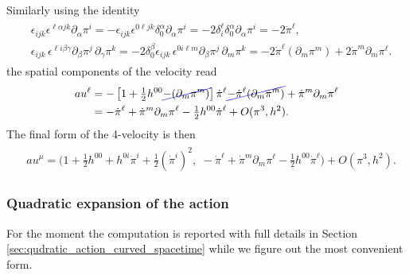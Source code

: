 Similarly using the identity
{\small\begin{align}\begin{aligned}
    &\epsilon_{ijk}\epsilon^{\ell\alpha jk}\partial_\alpha\pi^i= - \epsilon_{ijk}\epsilon^{0\ell jk}\delta^\alpha_0\partial_\alpha\pi^i = -2 \delta_i^\ell\delta^\alpha_0\partial_\alpha\pi^i = -2 \dot{\pi}^\ell,\\[2pt]
    & \epsilon_{ijk}\, \epsilon^{\ell i \beta\gamma}\partial_\beta\pi^j\,\partial_\gamma\pi^k= -2\delta^\beta_0 \epsilon_{ijk}\, \epsilon^{0 i \ell m} \partial_\beta\pi^j\,\partial_m\pi^k = -2 \dot{\pi}^\ell (\partial_m\pi^m) + 2 \dot{\pi}^m \partial_m\pi^\ell.
\end{aligned}
\end{align}}
the spatial components of the velocity read
{\small\begin{align}
    au^\ell &= -\left[1 + \tfrac12 h^{00}\bluecancel{-(\partial_m\pi^m)}\right]\dot{\pi}^\ell  \bluecancel{- \dot{\pi}^\ell (\partial_m\pi^m)} + \dot{\pi}^m \partial_m\pi^\ell\\
    &= - \dot{\pi}^\ell + \dot{\pi}^m \partial_m\pi^\ell - \tfrac12 h^{00}\dot{\pi}^\ell + O(\pi^3, h^2).
\end{align}}
The final form of the 4-velocity is then 
{\small\begin{align}
\begin{aligned}
    &au^\mu=\Big(1 + \tfrac12 h^{00} +h^{0i}\dot{\pi}^i+ \tfrac12 (\dot{\pi}^i)^2,\,\,- \dot{\pi}^\ell + \dot{\pi}^m \partial_m\pi^\ell - \tfrac12 h^{00}\dot{\pi}^\ell\Big)+ O(\pi^3, h^2).
\end{aligned}\end{align}}



\subsubsection{Quadratic expansion of the action}
For the moment the computation is reported with full details in Section \ref{sec:qudratic_action_curved_spacetime} while we figure out the most convenient form.